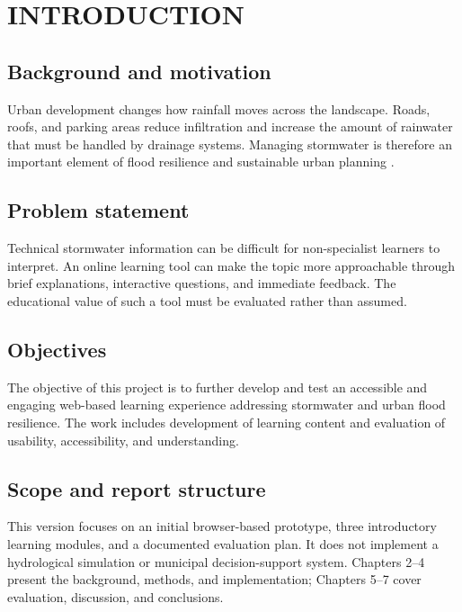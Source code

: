 \chapter{INTRODUCTION}
\section{Background and motivation}
Urban development changes how rainfall moves across the landscape. Roads, roofs, and parking areas reduce infiltration and increase the amount of rainwater that must be handled by drainage systems. Managing stormwater is therefore an important element of flood resilience and sustainable urban planning \parencite{epaGreenInfrastructure}.

\section{Problem statement}
Technical stormwater information can be difficult for non-specialist learners to interpret. An online learning tool can make the topic more approachable through brief explanations, interactive questions, and immediate feedback. The educational value of such a tool must be evaluated rather than assumed.

\section{Objectives}
The objective of this project is to further develop and test an accessible and engaging web-based learning experience addressing stormwater and urban flood resilience. The work includes development of learning content and evaluation of usability, accessibility, and understanding.

\section{Scope and report structure}
This version focuses on an initial browser-based prototype, three introductory learning modules, and a documented evaluation plan. It does not implement a hydrological simulation or municipal decision-support system. Chapters 2--4 present the background, methods, and implementation; Chapters 5--7 cover evaluation, discussion, and conclusions.
